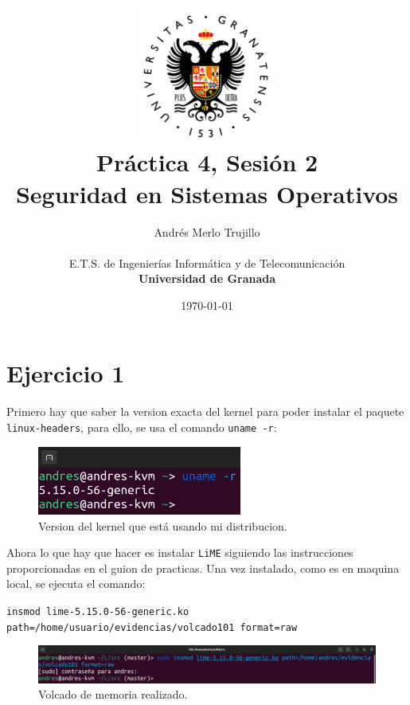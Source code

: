 \documentclass{article}
\title{
\includegraphics[width=1.75in]{imagenes/UGR-Logo.png} \\
\vspace*{1in}
\textbf{Práctica 4, Sesión 2} \\
Seguridad en Sistemas Operativos \\
\vspace*{0.5in}}
\author{Andrés Merlo Trujillo \\
\vspace*{0.5in} \\
E.T.S. de Ingenierías Informática y de Telecomunicación \\
\textbf{Universidad de Granada}} \date{\today}
\begin{document}
\begin{titlingpage}
\maketitle
\end{titlingpage}

\newpage

\tableofcontents

\newpage

\pagestyle{fancy}

\section{Ejercicio 1}

Primero hay que saber la version exacta del kernel para poder instalar el paquete \verb|linux-headers|, para ello, se usa el comando \verb|uname -r|:

\begin{figure}[H]
    \centering
    \includegraphics[width=0.6\textwidth]{imagenes/Captura desde 2022-12-06 11-37-14.png}
    \caption{Version del kernel que está usando mi distribucion.}
\end{figure}

Ahora lo que hay que hacer es instalar \verb|LiME| siguiendo las instrucciones proporcionadas en el guion de practicas. Una vez instalado, como es en maquina local, se ejecuta el comando:

\noindent
\verb|insmod lime-5.15.0-56-generic.ko path=/home/usuario/evidencias/volcado101 format=raw|

\begin{figure}[H]
    \centering
    \includegraphics[width=\textwidth]{imagenes/Captura desde 2022-12-06 11-41-59.png}
    \caption{Volcado de memoria realizado.}
\end{figure}
\end{document}
